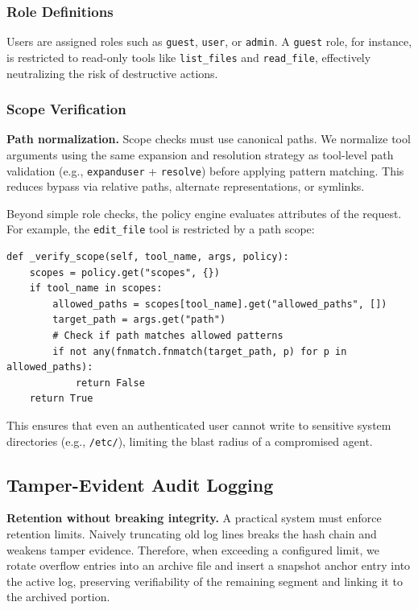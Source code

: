 \documentclass[conference]{IEEEtran}
\begin{document}
\subsubsection{Role Definitions}
Users are assigned roles such as \texttt{guest}, \texttt{user}, or \texttt{admin}. A \texttt{guest} role, for instance, is restricted to read-only tools like \texttt{list\_files} and \texttt{read\_file}, effectively neutralizing the risk of destructive actions.

\subsubsection{Scope Verification}
\textbf{Path normalization.} Scope checks must use canonical paths. We normalize tool arguments using the same expansion and resolution strategy as tool-level path validation (e.g., \texttt{expanduser} + \texttt{resolve}) before applying pattern matching. This reduces bypass via relative paths, alternate representations, or symlinks.

Beyond simple role checks, the policy engine evaluates attributes of the request. For example, the \texttt{edit\_file} tool is restricted by a path scope:

\begin{lstlisting}[caption={Scope Verification Logic}, label={lst:scope}]
def _verify_scope(self, tool_name, args, policy):
    scopes = policy.get("scopes", {})
    if tool_name in scopes:
        allowed_paths = scopes[tool_name].get("allowed_paths", [])
        target_path = args.get("path")
        # Check if path matches allowed patterns
        if not any(fnmatch.fnmatch(target_path, p) for p in allowed_paths):
            return False
    return True
\end{lstlisting}

This ensures that even an authenticated user cannot write to sensitive system directories (e.g., \texttt{/etc/}), limiting the blast radius of a compromised agent.

\subsection{Tamper-Evident Audit Logging}
\textbf{Retention without breaking integrity.} A practical system must enforce retention limits. Naively truncating old log lines breaks the hash chain and weakens tamper evidence. Therefore, when exceeding a configured limit, we rotate overflow entries into an archive file and insert a snapshot anchor entry into the active log, preserving verifiability of the remaining segment and linking it to the archived portion.
\end{document}
